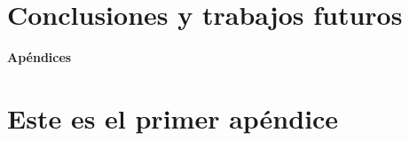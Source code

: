 \documentclass[12pt,twoside,titlepage]{report}
\newcommand\blankpage{%
    \newpage
    \null
    \thispagestyle{empty}%
    \newpage}
\begin{document}
\blankpage








\chapter{Conclusiones y trabajos futuros} \label{chap:conclusiones}



\blankpage






{}

\footnotesize{
%


}



\raggedbottom
\afterpage{\blankpage}

\newpage





\appendix

{}

\mbox{}
\vfill
\begin{center}
\begin{Huge}
\textbf{Apéndices}
\end{Huge}
\end{center}
\vfill
\mbox{}
\thispagestyle{empty}

\newpage
\mbox{}
\thispagestyle{empty}
\newpage


\chapter{Este es el primer apéndice} \label{chap:apendice}





\end{document}
